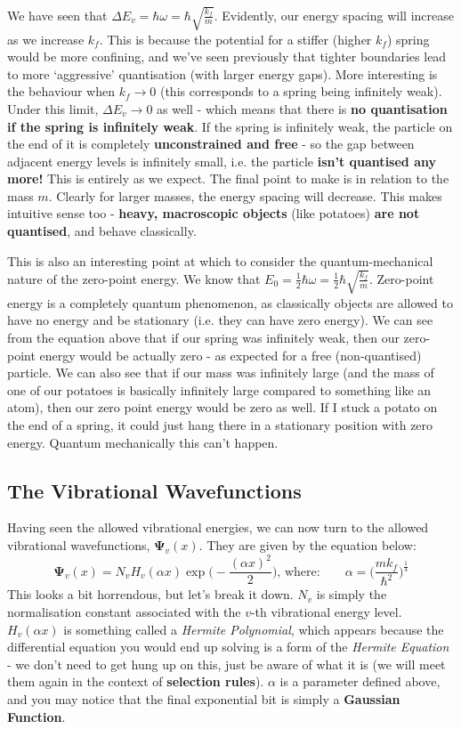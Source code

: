 \documentclass{memoir}[11pt,oneside,a4paper,openany]
\newcommand{\wf}{\ensuremath{\bm{\Psi}}\xspace}
\begin{document}
We have seen that $\Delta E_v = \hbar\omega = \hbar\sqrt{\frac{k_f}{m}}$. Evidently, our energy spacing will increase as we increase $k_f$. This is because the potential for a stiffer (higher $k_f$) spring would be more confining, and we've seen previously that tighter boundaries lead to more `aggressive' quantisation (with larger energy gaps). More interesting is the behaviour when $k_f\rightarrow 0$ (this corresponds to a spring being infinitely weak). Under this limit, $\Delta E_v \rightarrow 0$ as well - which means that there is \textbf{no quantisation if the spring is infinitely weak}. If the spring is infinitely weak, the particle on the end of it is completely \textbf{unconstrained and free} - so the gap between adjacent energy levels is infinitely small, i.e. the particle \textbf{isn't quantised any more!} This is entirely as we expect. The final point to make is in relation to the mass $m$. Clearly for larger masses, the energy spacing will decrease. This makes intuitive sense too - \textbf{heavy, macroscopic objects} (like potatoes) \textbf{are not quantised}, and behave classically.

This is also an interesting point at which to consider the quantum-mechanical nature of the zero-point energy. We know that $E_0 = \frac{1}{2}\hbar\omega = \frac{1}{2}\hbar\sqrt{\frac{k_f}{m}}$. Zero-point energy is a completely quantum phenomenon, as classically objects are allowed to have no energy and be stationary (i.e. they can have zero energy). We can see from the equation above that if our spring was infinitely weak, then our zero-point energy would be actually zero - as expected for a free (non-quantised) particle. We can also see that if our mass was infinitely large (and the mass of one of our potatoes is basically infinitely large compared to something like an atom), then our zero point energy would be zero as well. If I stuck a potato on the end of a spring, it could just hang there in a stationary position with zero energy. Quantum mechanically this can't happen. 

\subsection{The Vibrational Wavefunctions}
Having seen the allowed vibrational energies, we can now turn to the allowed vibrational wavefunctions, $\wf_v(x)$. They are given by the equation below:
\begin{equation}
	\wf_v(x) = N_vH_v(\alpha x)\exp{\bigg(-\frac{(\alpha x)^2}{2}\bigg)}, \,\text{where:} \qquad \alpha = \bigg(\frac{mk_f}{\hbar^2}\bigg)^{\frac{1}{4}}
\end{equation}
This looks a bit horrendous, but let's break it down. $N_v$ is simply the normalisation constant associated with the $v$-th vibrational energy level. $H_v(\alpha x)$ is something called a \emph{Hermite Polynomial}, which appears because the differential equation you would end up solving is a form of the \emph{Hermite Equation} - we don't need to get hung up on this, just be aware of what it is (we will meet them again in the context of \textbf{selection rules}). $\alpha$ is a parameter defined above, and you may notice that the final exponential bit is simply a \textbf{Gaussian Function}.
\end{document}
